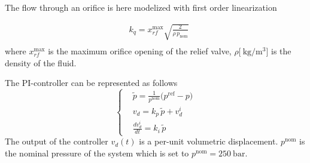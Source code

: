 \documentclass[12pt,a4paper,oneside]{book}
\begin{document}
\begin{onehalfspace}
The flow through an orifice is here modelized with first order linearization 

\begin{equation}
	\begin{aligned}
		&k_q = x_{rf}^{\text{max}}\sqrt{\frac{2}{\rho\,p_{\text{nom}}}} \\[6pt]
	\end{aligned}
\end{equation}
where $x_{rf}^{\text{max}}$ is the maximum orifice opening of the relief valve, $\rho \big[\SI{}{\kilogram\per\cubic\meter}\big]$ is the density of the fluid.


The PI-controller can be represented as follows
\begin{equation}
	\left\lbrace \begin{aligned}
		&\tilde{p} = \frac{1}{p^{\text{nom}}}\Big(p^{\text{ref}} - p\Big)\\[6pt]
		&v_d = k_p\,\tilde{p} + v_d^i \\[6pt]
		&\frac{dv_d^i}{dt} = k_i\,\tilde{p}	
	\end{aligned}\right. 
\end{equation}
The output of the controller $v_d(t)$ is a per-unit volumetric displacement. $p^{\text{nom}}$ is the nominal pressure of the system which is set to $p^{\text{nom}}=\SI{250}{\bar}$.


\end{onehalfspace}
\end{document}
